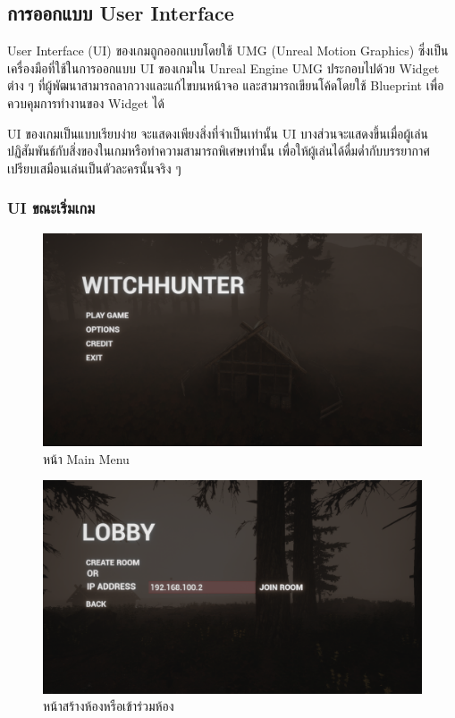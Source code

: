 \subsection{การออกแบบ User Interface}

User Interface (UI) ของเกมถูกออกแบบโดยใช้ UMG (Unreal Motion Graphics) ซึ่งเป็นเครื่องมือที่ใช้ในการออกแบบ UI ของเกมใน Unreal Engine
UMG ประกอบไปด้วย Widget ต่าง ๆ ที่ผู้พัฒนาสามารถลากวางและแก้ไขบนหน้าจอ และสามารถเขียนโค้ดโดยใช้ Blueprint เพื่อควบคุมการทำงานของ Widget ได้

UI ของเกมเป็นแบบเรียบง่าย จะแสดงเพียงสิ่งที่จำเป็นเท่านั้น UI บางส่วนจะแสดงขึ้นเมื่อผู้เล่นปฏิสัมพันธ์กับสิ่งของในเกมหรือทำความสามารถพิเศษเท่านั้น 
เพื่อให้ผู้เล่นได้ดื่มด่ำกับบรรยากาศเปรียบเสมือนเล่นเป็นตัวละครนั้นจริง ๆ

\subsubsection{UI ขณะเริ่มเกม}

\begin{figure}[h]
  \begin{center}
  \includegraphics[width=\textwidth]{./img/UI/mainmenu.png}
  \end{center}
  \caption[หน้า Main Menu]{หน้า Main Menu}
  \label{fig:main_menu}
\end{figure}

\pagebreak

\begin{figure}[h!]
  \begin{center}
  \includegraphics[width=\textwidth]{./img/UI/create_room.png}
  \end{center}
  \caption[หน้าสร้างห้องหรือเข้าร่วมห้อง]{หน้าสร้างห้องหรือเข้าร่วมห้อง}
  \label{fig:create_room}
\end{figure}

